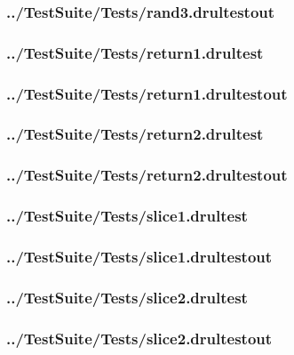\begin{changemargin}{-1in}{-1in}
\subsubsection{../TestSuite/Tests/rand3.drultestout}


\subsubsection{../TestSuite/Tests/return1.drultest}


\subsubsection{../TestSuite/Tests/return1.drultestout}


\subsubsection{../TestSuite/Tests/return2.drultest}


\subsubsection{../TestSuite/Tests/return2.drultestout}


\subsubsection{../TestSuite/Tests/slice1.drultest}


\subsubsection{../TestSuite/Tests/slice1.drultestout}


\subsubsection{../TestSuite/Tests/slice2.drultest}


\subsubsection{../TestSuite/Tests/slice2.drultestout}



\end{changemargin}
